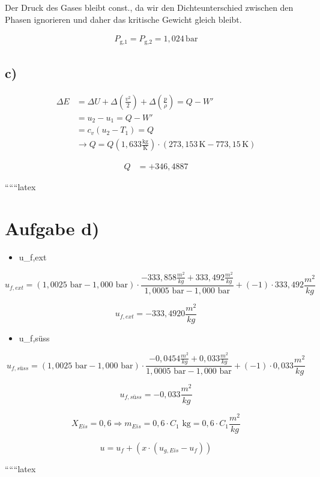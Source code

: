 Der Druck des Gases bleibt const., da wir den Dichteunterschied zwischen den Phasen ignorieren und daher das kritische Gewicht gleich bleibt.

\begin{align*}
P_{\text{g,1}} = P_{\text{g,2}} = 1,024 \, \text{bar}
\end{align*}

\subsection*{c)}

\begin{align*}
\Delta E &= \Delta U + \Delta \left( \frac{v^2}{2} \right) + \Delta \left( \frac{p}{\rho} \right) = Q - W' \\
&= u_2 - u_1 = Q - W' \\
&= c_v \left( u_2 - T_1 \right) = Q \\
&\rightarrow Q = Q \left( 1,633 \frac{\text{kg}}{\text{K}} \right) \cdot \left( 273,153 \, \text{K} - 773,15 \, \text{K} \right)
\end{align*}

\begin{align*}
Q &= +346,4887
\end{align*}

``````latex


\section*{Aufgabe d)}


\begin{itemize}
    \item {} u_{f,ext}
\end{itemize}

\[
u_{f,ext} = (1,0025 \text{ bar} - 1,000 \text{ bar}) \cdot \frac{-333,858 \frac{m^2}{kg} + 333,492 \frac{m^2}{kg}}{1,0005 \text{ bar} - 1,000 \text{ bar}} + (-1) \cdot 333,492 \frac{m^2}{kg}
\]

\[
u_{f,ext} = -333,4920 \frac{m^2}{kg}
\]

\begin{itemize}
    \item {} u_{f,süss}
\end{itemize}

\[
u_{f,süss} = (1,0025 \text{ bar} - 1,000 \text{ bar}) \cdot \frac{-0,0454 \frac{m^2}{kg} + 0,033 \frac{m^2}{kg}}{1,0005 \text{ bar} - 1,000 \text{ bar}} + (-1) \cdot 0,033 \frac{m^2}{kg}
\]

\[
u_{f,süss} = -0,033 \frac{m^2}{kg}
\]

\[
X_{Eis} = 0,6 \Rightarrow m_{Eis} = 0,6 \cdot C_{1} \text{ kg} = 0,6 \cdot C_{1} \frac{m^2}{kg}
\]

\[
u = u_f + (x \cdot (u_{g,Eis} - u_f))
\]

``````latex


